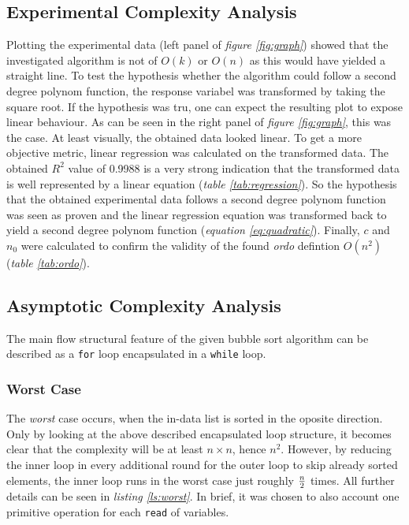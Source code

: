 \documentclass[a4paper,11pt,twoside]{article}
\begin{document}
\subsection{Experimental Complexity Analysis}
Plotting the experimental data (left panel of \textit{figure \ref{fig:graph}}) showed that
the investigated algorithm is not of $O(k)$ or $O(n)$ as this would
have yielded a straight line. To test the hypothesis whether the
algorithm could follow a second degree polynom function, the response
variabel was transformed by taking the square root. If the hypothesis
was tru, one can expect the resulting plot to expose linear behaviour. As can be seen in the
right panel of \textit{figure \ref{fig:graph}}, this was the case. At least
visually, the obtained data looked linear. To get a more objective
metric, linear regression was calculated on the transformed data. The
obtained $R^2$ value of 0.9988 is a very strong indication that the
transformed data is well represented by a linear equation 
(\textit{table \ref{tab:regression}}). So the hypothesis that the obtained
experimental data follows a second degree polynom function was
seen as proven and the linear regression equation was transformed back
to yield a second degree polynom function (\textit{equation
\ref{eq:quadratic}}). Finally, $c$ and $n_{0}$ were calculated to confirm
the validity of the found \emph{ordo} defintion $O(n^2)$(\textit{table \ref{tab:ordo}}). 


\subsection{Asymptotic Complexity Analysis}
The main flow structural feature of the given bubble sort algorithm can be
described as a \verb!for! loop encapsulated in a \verb!while!
loop. 

\subsubsection{Worst Case}
The \emph{worst} case occurs, when the in-data list is sorted in the
oposite direction. Only by looking at the above described encapsulated
loop structure, it becomes clear that the complexity will be at least
$n \times n$, hence $n^2$. However, by reducing the inner loop in
every additional round for the outer loop to skip already sorted
elements, the inner loop runs in the worst case just roughly ${n \over
  2}$ times. All further details can be seen in \textit{listing
\ref{ls:worst}}. In brief, it was chosen to also account one primitive
operation for each \verb!read! of variables.
\end{document}
